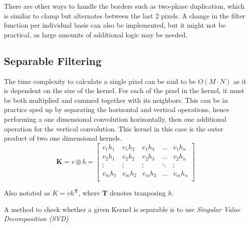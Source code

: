 \documentclass[twoside,a4paper,article]{combine}
\begin{document}
There are other ways to handle the borders such as two-phase duplication,
which is similar to clamp but alternates between the last 2 pixels.
A change in the filter function per individual basis can also be implemented, but it might not be practical,
as large amounts of additional logic may be needed\cite{BaileyAmbikumar18}.

\subsection{Separable Filtering}
The time complexity to calculate a single pixel can be said to be $O(M \cdot N)$ as it is dependent
on the size of the kernel. For each of the pixel in the kernel, it must be both multiplied and summed together
with its neighbors. This can be in practice sped up by separating the horizontal and vertical operations, hence performing
a one dimensional convolution horizontally, then one additional operation for the vertical convolution. This kernel in this case is the
outer product of two one dimensional kernels\cite{Szeliski_2022}. 
\[
    \boldsymbol{K} = v \otimes h = 
    \begin{bmatrix}
        v_1h_1 & v_1h_2 & v_1 h_3 & \hdots & v_1h_n \\
        v_2h_1 & v_2h_2 & v_2 h_3 & \hdots & v_2h_n \\
        \vdots & \vdots & \vdots & \ddots & \vdots \\
        v_m h_1 & v_m h_2 & v_m h_3 & \hdots & v_m h_n \\
    \end{bmatrix}
\]

Also notated as $K=vh^{\boldsymbol{T}}$, where $\boldsymbol{T}$ denotes tranposing $h$.

A method to check whether a given Kernel is separable is to use \emph{Singular Value Decomposition (SVD)} \cite{Szeliski_2022}
\end{document}
